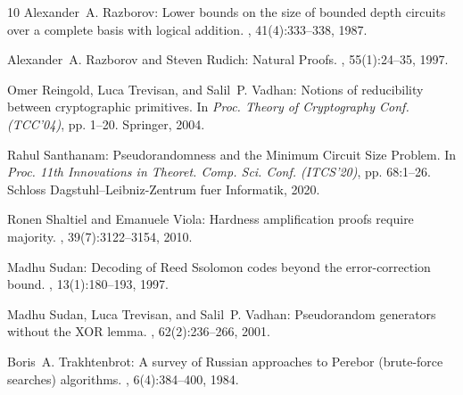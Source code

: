 \documentclass[11pt]{article}
\numberwithin{equation}{section}
\theoremstyle{definition}
\theoremstyle{plain}
\begin{document}
\begin{thebibliography}{10}
{\sc Alexander~A. Razborov}: Lower bounds on the size of bounded depth circuits
  over a complete basis with logical addition.
,
  41(4):333--338, 1987.
\newblock [\epfmtdoi{10.1007/BF01137685}]

{\sc Alexander~A. Razborov and Steven Rudich}: Natural {P}roofs.
, 55(1):24--35, 1997.

{\sc Omer Reingold, Luca Trevisan, and Salil~P. Vadhan}: Notions of
  reducibility between cryptographic primitives.
\newblock In {\em Proc. Theory of Cryptography Conf. (TCC'04)}, pp. 1--20.
  Springer, 2004.
\newblock [\epfmtdoi{10.1007/978-3-540-24638-1\_1}]

{\sc Rahul Santhanam}: Pseudorandomness and the {M}inimum {C}ircuit {S}ize
  {P}roblem.
\newblock In {\em Proc. 11th Innovations in Theoret. Comp. Sci. Conf.
  (ITCS'20)}, pp. 68:1--26. Schloss Dagstuhl--Leibniz-Zentrum fuer Informatik,
  2020.

{\sc Ronen Shaltiel and Emanuele Viola}: Hardness amplification proofs require
  majority.
, 39(7):3122--3154, 2010.
\newblock [\epfmtdoi{10.1137/080735096}]

{\sc Madhu Sudan}: Decoding of {R}eed {S}solomon codes beyond the
  error-correction bound.
, 13(1):180--193, 1997.

{\sc Madhu Sudan, Luca Trevisan, and Salil~P. Vadhan}: Pseudorandom generators
  without the {XOR} lemma.
, 62(2):236--266, 2001.

{\sc Boris~A. Trakhtenbrot}: A survey of {R}ussian approaches to {P}erebor
  (brute-force searches) algorithms.
, 6(4):384--400, 1984.


\end{thebibliography}
\end{document}
